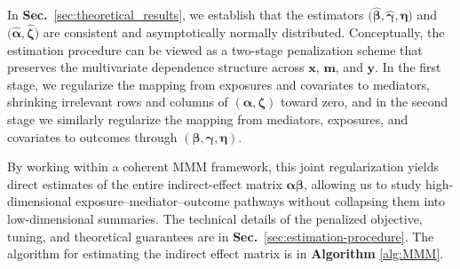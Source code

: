 \documentclass[
  12pt]{article}
\def\M{\mathbf{m}}
\def\X{\mathbf{x}}
\def\Y{\mathbf{y}}
\begin{document}
In \textbf{Sec.}~\ref{sec:theoretical_results}, we establish that the estimators $\big( \widehat{\bm{\beta}}, \widehat{\bm{\gamma}}, \widehat{\bm{\eta}} \big)$ and $\big( \widehat{\bm{\alpha}}, \widehat{\bm{\zeta}} \big)$ are consistent and asymptotically normally distributed. Conceptually, the estimation procedure can be viewed as a two-stage penalization scheme that preserves the multivariate dependence structure across $\X$, $\M$, and $\Y$.
In the first stage, we regularize the mapping from exposures and covariates to mediators, shrinking irrelevant rows and columns of $(\bm{\alpha},\bm{\zeta})$ toward zero, and in the second stage we similarly regularize the mapping from mediators, exposures, and covariates to outcomes through $(\bm{\beta} , \bm{\gamma} , \bm{\eta})$.

By working within a coherent MMM framework, this joint regularization yields direct estimates of the entire indirect-effect matrix $\bm{\alpha \beta}$, allowing us to study high-dimensional exposure--mediator--outcome pathways without collapsing them into low-dimensional summaries.
The technical details of the penalized objective, tuning, and theoretical guarantees are in \textbf{Sec.}~\ref{sec:estimation-procedure}. The algorithm for estimating the indirect effect matrix is in \textbf{Algorithm} \ref{alg:MMM}.
\end{document}
